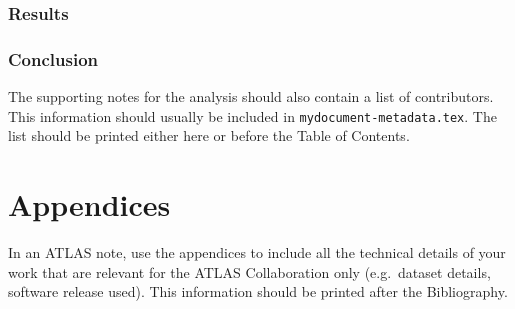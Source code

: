 \documentclass[NOTE, atlasdraft=true, texlive=2019, UKenglish]{atlasdoc}
\begin{document}



\section{Results}\label{Results}
\label{sec:results}





\section{Conclusion}\label{Conclusion}
\label{sec:conclusion}




\printbibliography
% 
% 

\clearpage
The supporting notes for the analysis should also contain a list of contributors.
This information should usually be included in \texttt{mydocument-metadata.tex}.
The list should be printed either here or before the Table of Contents.


\clearpage
\appendix
\part*{Appendices}

In an ATLAS note, use the appendices to include all the technical details of your work
that are relevant for the ATLAS Collaboration only (e.g.\ dataset details, software release used).
This information should be printed after the Bibliography.
\end{document}
